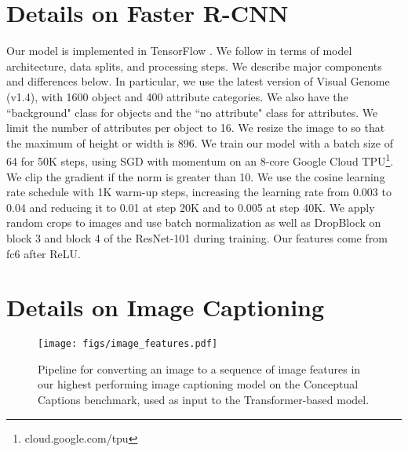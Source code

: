 \documentclass[11pt,a4paper]{article}
\begin{document}
\section{Details on Faster R-CNN}
Our model is implemented in TensorFlow \cite{tensorflow2015-whitepaper}.
We follow  in terms of model architecture, data splits, and processing steps.
We describe major components and differences below.
In particular, we use the latest version of Visual Genome (v1.4), with 1600 object and 400 attribute categories.
We also have the ``background" class for objects and the ``no attribute" class for attributes.
We limit the number of attributes per object to 16.
We resize the image to so that the maximum of height or width is 896.
We train our model with a batch size of 64 for 50K steps, using SGD with momentum on an 8-core Google Cloud TPU\footnote{cloud.google.com/tpu}.
We clip the gradient if the norm is greater than 10.
We use the cosine learning rate schedule with 1K warm-up steps, increasing the learning rate from 0.003 to 0.04 and reducing it to 0.01 at step 20K and to 0.005 at step 40K.
We apply random crops to images and use batch normalization \cite{ioffe15batch} as well as DropBlock \cite{ghiasi18dropblock} on block 3 and block 4 of the ResNet-101 during training.
Our features come from fc6 after ReLU.

\section{Details on Image Captioning}

\begin{figure*}[ht]
\begin{center}
 \texttt{[image: figs/image\_features.pdf]}
\end{center}
 \caption{Pipeline for converting an image to a sequence of image features in our highest performing image captioning model on the Conceptual Captions benchmark, used as input to the Transformer-based model.}
\label{fig:image_features}
\end{figure*}
\end{document}
